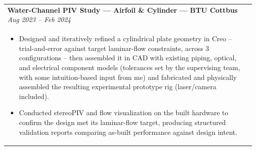\documentclass[a4paper,8pt]{article}
\begin{document}
\begin{tabularx}{\linewidth}{ @{}l r@{} }
\textbf{Water-Channel PIV Study — Airfoil \& Cylinder — } \color[HTML]{371e77}\textbf{BTU Cottbus} \hfill \textit{Aug 2023 -- Feb 2024}\\[1pt]
\begin{minipage}[t]{\linewidth}
    \begin{itemize}[nosep,after=\strut, leftmargin=*, itemsep=1pt]
        \item Designed and iteratively refined a cylindrical plate geometry in Creo -- trial-and-error against target laminar-flow constraints, across 3 configurations -- then assembled it in CAD with existing piping, optical, and electrical component models (tolerances set by the supervising team, with some intuition-based input from me) and fabricated and physically assembled the resulting experimental prototype rig (laser/camera included).
        \item Conducted stereoPIV and flow visualization on the built hardware to confirm the design met its laminar-flow target, producing structured validation reports comparing as-built performance against design intent.
    \end{itemize}
\end{minipage}
\end{tabularx}


\end{document}
